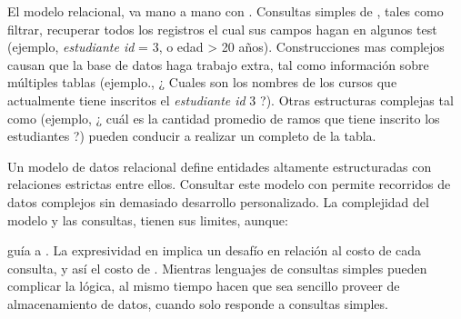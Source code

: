 El modelo relacional, va mano a mano con \sqlNAME. Consultas simples de \sqlNAME, tales como filtrar, recuperar todos los registros el cual sus campos hagan \match en algunos test (ejemplo, \textit{estudiante id} = 3, o edad > 20 años). Construcciones mas complejos causan que la base de datos haga trabajo extra, tal como \joining información sobre múltiples tablas (ejemplo., ¿ Cuales son los nombres de los cursos que actualmente tiene inscritos el \textit{estudiante id} 3 ?). Otras estructuras complejas tal como \aggregatesDB (ejemplo, ¿ cuál es la cantidad promedio de ramos que tiene inscrito los estudiantes
?) pueden conducir a realizar un \scan completo de la tabla.


Un modelo de datos relacional define entidades altamente estructuradas con relaciones estrictas entre ellos. Consultar este modelo con \sqlNAME permite recorridos de datos complejos sin demasiado desarrollo personalizado. La complejidad del modelo y las consultas, tienen sus limites, aunque:


\complexity guía a \unpredictability. La expresividad en \sqlNAME implica un desafío en relación al costo de cada consulta, y así el costo de \workload. Mientras lenguajes de consultas simples pueden complicar la lógica, al mismo tiempo hacen que sea sencillo proveer de almacenamiento de datos, cuando solo responde a consultas simples.

